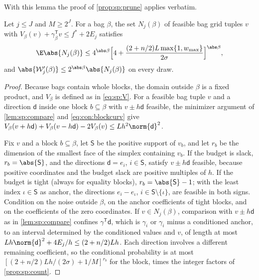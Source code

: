 With this lemma the proof of \cref{prop:sp:prune} applies verbatim.

\begin{lemma}\label{lem:con:simplex-count}
Let $j\le J$ and $M\ge2^J$. For a bag $\beta$, the set $N_j(\beta)$ of feasible
bag grid tuples $v$ with $V_\beta(v)+\gamma_\beta^{\mathsf T}v\le f^*+2E_j$
satisfies
\[
 \E\abs{N_j(\beta)}\le4^{\abs\beta}\Bigl[4+\frac{(2+n/2)L\max\{1,w_{\max}\}}{2\sigma}\Bigr]^{\abs\beta},
\]
and $\abs{\mathcal W'_j(\beta)}\le2^{\abs\beta}\abs{N_j(\beta)}$ on every draw.
\end{lemma}

\begin{proof}
Because bags contain whole blocks, the domain outside $\beta$ is a fixed
product, and $V_\beta$ is defined as in \eqref{eq:sp:V}. For a feasible bag
tuple $v$ and a direction $\mathsf d$ inside one block $b\subseteq\beta$ with
$v\pm h\mathsf d$ feasible, the minimizer argument of \cref{lem:sp:compare}
and \eqref{eq:con:blockcurv} give
$V_\beta(v+h\mathsf d)+V_\beta(v-h\mathsf d)-2V_\beta(v)\le Lh^2\norm{\mathsf d}^2$.

Fix $v$ and a block $b\subseteq\beta$, let $\mathsf S$ be the positive support
of $v_b$, and let $r_b$ be the dimension of the smallest face of the
simplex containing $v_b$. If the budget is slack, $r_b=\abs{\mathsf S}$, and
the directions $\mathsf d=e_i$, $i\in\mathsf S$, satisfy $v\pm h\mathsf d$
feasible, because positive coordinates and the budget slack are positive
multiples of $h$. If the budget is tight (always for equality blocks),
$r_b=\abs{\mathsf S}-1$; with the least index $\iota\in\mathsf S$ as anchor, the
directions $e_i-e_\iota$, $i\in\mathsf S\setminus\{\iota\}$, are feasible in
both signs. Condition on the noise outside $\beta$, on the anchor
coefficients of tight blocks, and on the coefficients of the zero coordinates.
If $v\in N_j(\beta)$, comparison with $v\pm h\mathsf d$ as in
\cref{lem:sp:compare} confines $\gamma^{\mathsf T}\mathsf d$, which is $\gamma_i$
or $\gamma_i$ minus a conditioned anchor, to an interval determined by the
conditioned values and $v$, of length at most
$Lh\norm{\mathsf d}^2+4E_j/h\le(2+n/2)Lh$. Each direction involves a different
remaining coefficient, so the conditional probability is at most
$[(2+n/2)Lh/(2\sigma)+1/M]^{r_b}$ for the block, times the integer factors of
\cref{prop:sp:count}.


\end{proof}
